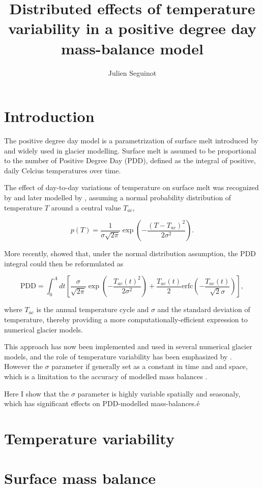 \documentclass[twocolumn]{igs}
\begin{document}
\title[Temperature variability in a positive degree day model]{Distributed effects of temperature variability in a positive degree day mass-balance model}
\author[J. Seguinot]{Julien Seguinot}

\maketitle


\section{Introduction}

The positive degree day model is a parametrization of surface melt introduced by \citet{braithwaite-1984} and widely used in glacier modelling. Surface melt is assumed to be proportional to the number of Positive Degree Day (PDD), defined as the integral of positive, daily Celcius temperatures over time.

The effect of day-to-day variations of temperature on surface melt was recognized by \citet{braithwaite-1984} and later modelled by \citet{reeh-1991}, assuming a normal probability distribution of temperature $T$ around a central value $T_{ac}$,

\begin{equation}
  p(T) = \frac{1}{\sigma\sqrt{2\pi}}
    \exp\left({-\frac{(T-T_{ac})^2}{2\sigma^2}}\right).
\end{equation}

More recently, \citet{calov-greve-2005} showed that, under the normal distribution assumption, the PDD integral could then be reformulated as

\begin{equation}
  \mathrm{PDD} = \int_{0}^{A} dt \left[
    \frac{\sigma}{\sqrt{2\pi}}
    \exp\left({-\frac{T_{ac}(t)^2}{2\sigma^2}}\right)
    +\frac{T_{ac}(t)}{2}
    \mathrm{erfc} \left(-\frac{T_{ac}(t)}{\sqrt{2}\sigma}\right)
  \right],
\end{equation}

where $T_{ac}$ is the annual temperature cycle and $\sigma$ and the standard deviation of temperature, thereby providing a more computationally-efficient expression to numerical glacier models.

This approach has now been implemented and used in several numerical glacier models, and the role of temperature variability has been emphasized by \citet{charbit-etal-2012}. However the $\sigma$ parameter if generally set as a constant in time and and space, which is a limitation to the accuracy of modelled mass balances \citep{charbit-etal-2012}.

Here I show that the $\sigma$ parameter is highly variable spatially and seasonaly, which has significant effects on PDD-modelled mass-balances.é

\section{Temperature variability}

\section{Surface mass balance}



\end{document}
